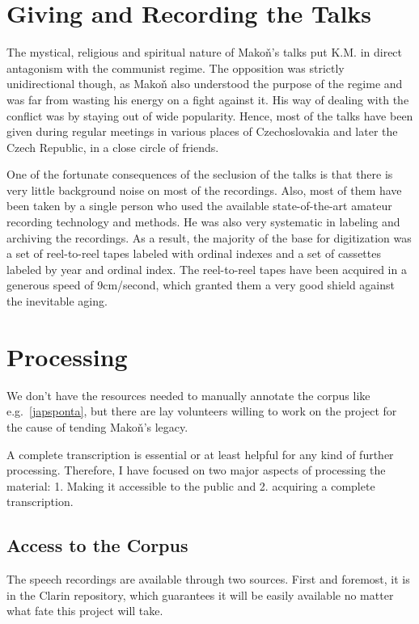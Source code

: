 \documentclass[a4paper,11pt]{article}
\begin{document}
\section{Giving and Recording the Talks}

The mystical, religious and spiritual nature of Mako\v{n}'s talks put K.M. in
direct antagonism with the communist regime. The opposition was strictly
unidirectional though, as Mako\v{n} also understood the purpose of the regime
and was far from wasting his energy on a fight against it. His way of dealing
with the conflict was by staying out of wide popularity. Hence, most of the
talks have been given during regular meetings in various places of
Czechoslovakia and later the Czech Republic, in a close circle of friends.

One of the fortunate consequences of the seclusion of the talks is that there is
very little background noise on most of the recordings. Also, most of them
have been taken by a single person who used the available state-of-the-art
amateur recording technology and methods. He was also very systematic in
labeling and archiving the recordings. As a result, the majority of the base for
digitization was a set of reel-to-reel tapes labeled with ordinal indexes and a
set of cassettes labeled by year and ordinal index. The reel-to-reel tapes have
been acquired in a generous speed of 9cm/second, which granted them a very good
shield against the inevitable aging.

\section{Processing}

We don't have the resources needed to manually annotate the corpus like
e.g.~\ref{japsponta}, but there are lay
volunteers willing to work on the project for the cause of tending Mako\v{n}'s
legacy.

A complete transcription is essential or at least helpful for any kind of
further processing.  Therefore,
I have focused on two major aspects of processing the material: 1. Making it
accessible to the public and 2. acquiring a complete transcription.

\subsection{Access to the Corpus}

The speech recordings are available through two sources. First and foremost,
it is in the Clarin repository, which guarantees it will be easily available no
matter what fate this project will take.
\end{document}
